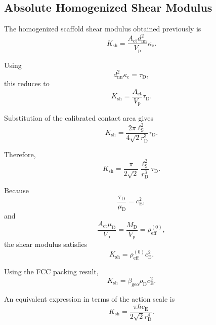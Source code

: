 \subsection{Absolute Homogenized Shear Modulus}

The homogenized scaffold shear modulus obtained previously is
\begin{equation}
    K_{\mathrm{sh}} = \frac{ A_{\mathrm{ct}}d_{\mathrm{nn}}^2 }{ V_{\mathrm{p}} } \kappa_{\mathrm{c}}.
\end{equation}

Using
\begin{equation}
    d_{\mathrm{nn}}^2\kappa_{\mathrm{c}} = \tau_{\mathrm{D}},
\end{equation}
this reduces to
\begin{equation}
    K_{\mathrm{sh}} = \frac{A_{\mathrm{ct}}}{V_{\mathrm{p}}} \tau_{\mathrm{D}}.
\end{equation}

Substitution of the calibrated contact area gives
\begin{equation}
    \boxed{ K_{\mathrm{sh}} = \frac{ 2\pi\ell_{\mathrm{S}}^2 }{ 4\sqrt{2}r_{\mathrm{D}}^3 } \tau_{\mathrm{D}} }.
\end{equation}

Therefore,
\begin{equation}
    \boxed{ K_{\mathrm{sh}} = \frac{\pi}{2\sqrt{2}} \frac{\ell_{\mathrm{S}}^2}{r_{\mathrm{D}}^3} \tau_{\mathrm{D}} }.
\end{equation}

Because
\begin{equation}
    \frac{\tau_{\mathrm{D}}}{\mu_{\mathrm{D}}} = c_{\mathrm{E}}^2,
\end{equation}
and
\begin{equation}
    \frac{ A_{\mathrm{ct}}\mu_{\mathrm{D}} }{ V_{\mathrm{p}} } = \frac{M_{\mathrm{D}}}{V_{\mathrm{p}}} = \rho_{\mathrm{eff}}^{(0)},
\end{equation}
the shear modulus satisfies
\begin{equation}
    \boxed{ K_{\mathrm{sh}} = \rho_{\mathrm{eff}}^{(0)} c_{\mathrm{E}}^2 }.
\end{equation}

Using the FCC packing result,
\begin{equation}
    \boxed{ K_{\mathrm{sh}} = \beta_{\mathrm{geo}} \rho_{\mathrm{D}} c_{\mathrm{E}}^2 }.
\end{equation}

An equivalent expression in terms of the action scale is
\begin{equation}
    \boxed{ K_{\mathrm{sh}} = \frac{ \pi\hbar c_{\mathrm{E}} }{ 2\sqrt{2}r_{\mathrm{D}}^4 } }.
\end{equation}

